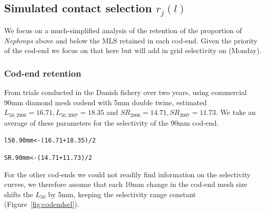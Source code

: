\documentclass[12pt]{article}\usepackage[]{graphicx}\usepackage[]{color}
\makeatletter
\newcommand{\hlnum}[1]{\textcolor[rgb]{0.686,0.059,0.569}{#1}}%
\newcommand{\hlopt}[1]{\textcolor[rgb]{0,0,0}{#1}}%
\newcommand{\hlstd}[1]{\textcolor[rgb]{0.345,0.345,0.345}{#1}}%
\newcommand{\hlkwb}[1]{\textcolor[rgb]{0.69,0.353,0.396}{#1}}%
\newenvironment{kframe}{%
 \def\at@end@of@kframe{}%
 \ifinner\ifhmode%
  \def\at@end@of@kframe{\end{minipage}}%
  \begin{minipage}{\columnwidth}%
 \fi\fi%
 \def\FrameCommand##1{\hskip\@totalleftmargin \hskip-\fboxsep
 \colorbox{shadecolor}{##1}\hskip-\fboxsep
     \hskip-\linewidth \hskip-\@totalleftmargin \hskip\columnwidth}%
 \MakeFramed {\advance\hsize-\width
   \@totalleftmargin\z@ \linewidth\hsize
   \@setminipage}}%
 {\par\unskip\endMakeFramed%
 \at@end@of@kframe}
\newenvironment{knitrout}{}{} %
\makeatother
\begin{document}
\subsection{Simulated contact selection $r_j(l)$}
We focus on a much-simplified analysis of the retention of the proportion of \emph{Nephrops} above and below the MLS retained in each cod-end. Given the priority of the cod-end we focus on that here but will add in grid selectivity on (Monday).

\subsubsection{Cod-end retention}
From trials conducted in the Danish fishery over two years, using commercial 90mm diamond mesh codend with 5mm double twine, \citet{Frandsen:etal:2010} estimated $L_{50, 2006} = 16.71, L_{50, 2007} = 18.35$ and $SR_{2006} = 14.71, SR_{2007} = 11.73$. We take an average of these parameters for the selectivity of the 90mm cod-end.

\begin{knitrout}\footnotesize
{}\color{fgcolor}\begin{kframe}
\begin{alltt}
\hlstd{l50.90mm} \hlkwb{<-} \hlstd{(}\hlnum{16.71} \hlopt{+} \hlnum{18.35}\hlstd{)} \hlopt{/} \hlnum{2}

\hlstd{SR.90mm} \hlkwb{<-} \hlstd{(}\hlnum{14.71} \hlopt{+} \hlnum{11.73}\hlstd{)} \hlopt{/} \hlnum{2}
\end{alltt}
\end{kframe}
\end{knitrout}
For the other cod-ends we could not readily find information on the selectivity curves, we therefore assume that each 10mm change in the cod-end mesh size shifts the $L_{50}$ by 5mm, keeping the selectivity range constant (Figure~\ref{fig:codendsel}).
\end{document}

